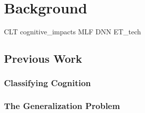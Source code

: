 \chapter{Background} \label{ch:bt}

{CLT}
{cognitive_impacts}
{MLF}
{DNN}
{ET_tech}

\section{Previous Work} \label{sec:bt/previous_work}
\subsection{Classifying Cognition}
\subsection{The Generalization Problem}